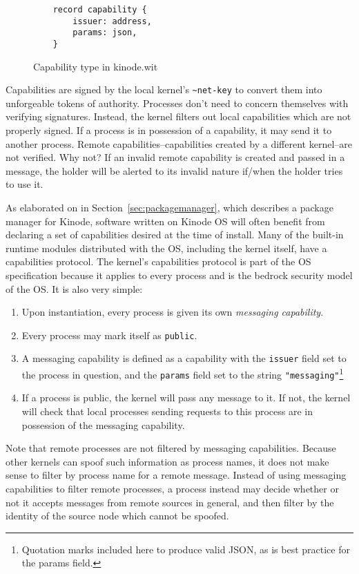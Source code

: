 \documentclass[runningheads]{llncs}
\begin{document}
\begin{figure}[H]
    \centering
    \begin{verbatim}
    record capability {
        issuer: address,
        params: json,
    }
    \end{verbatim}
    \caption{Capability type in kinode.wit}
    \label{fig:WIT Types 3}
\end{figure}

Capabilities are signed by the local kernel's \verb|~net-key| to convert them into unforgeable tokens of authority.
Processes don't need to concern themselves with verifying signatures.
Instead, the kernel filters out local capabilities which are not properly signed.
If a process is in possession of a capability, it may send it to another process.
Remote capabilities–capabilities created by a different kernel–are not verified.
Why not?
If an invalid remote capability is created and passed in a message, the holder will be alerted to its invalid nature if/when the holder tries to use it.

As elaborated on in Section~\ref{sec:packagemanager}, which describes a package manager for Kinode, software written on Kinode OS will often benefit from declaring a set of capabilities desired at the time of install.
Many of the built-in runtime modules distributed with the OS, including the kernel itself, have a capabilities protocol.
The kernel's capabilities protocol is part of the OS specification because it applies to every process and is the bedrock security model of the OS.
It is also very simple:
\begin{enumerate}
    \item Upon instantiation, every process is given its own \textit{messaging capability}.
    \item Every process may mark itself as \verb|public|.
    \item A messaging capability is defined as a capability with the \verb|issuer| field set to the process in question, and the \verb|params| field set to the string \verb|"messaging"|\footnote{Quotation marks included here to produce valid JSON, as is best practice for the params field.}
    \item If a process is public, the kernel will pass any message to it. If not, the kernel will check that local processes sending requests to this process are in possession of the messaging capability.
\end{enumerate}

Note that remote processes are not filtered by messaging capabilities.
Because other kernels can spoof such information as process names, it does not make sense to filter by process name for a remote message.
Instead of using messaging capabilities to filter remote processes, a process instead may decide whether or not it accepts messages from remote sources in general, and then filter by the identity of the source node which cannot be spoofed.
\end{document}
